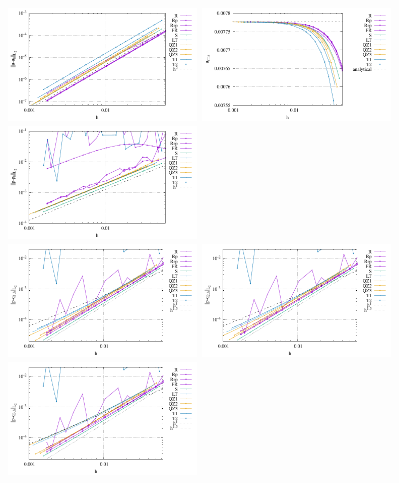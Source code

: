 \begin{center}
\includegraphics[width=5cm]{python_codes/fieldstone_78/results/errors_u_exp1.pdf}
\includegraphics[width=5cm]{python_codes/fieldstone_78/results/vrms_exp1.pdf} 
\includegraphics[width=5cm]{python_codes/fieldstone_78/results/errors_p_exp1.pdf}\\
\includegraphics[width=5cm]{python_codes/fieldstone_78/results/errors_q1_exp1.pdf}
\includegraphics[width=5cm]{python_codes/fieldstone_78/results/errors_q2_exp1.pdf}
\includegraphics[width=5cm]{python_codes/fieldstone_78/results/errors_q3_exp1.pdf}\\

\end{center}
